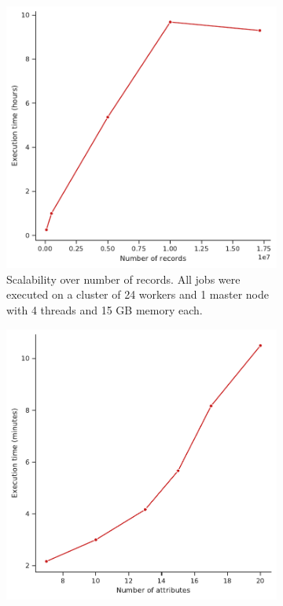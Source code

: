 \documentclass{article}
\begin{document}
    \begin{figure}
        \centering
        \begin{subfigure}[t]{0.45\textwidth}
            \centering
            \includegraphics[width=\textwidth]{figures/plot_num_records.pdf}
            \caption{Scalability over number of records. All jobs were executed on a cluster of 24 workers and 1 master node with 4 threads and 15 GB memory each.}
            \label{fig:plot records}
        \end{subfigure}
        \hfill
        \begin{subfigure}[t]{0.45\textwidth}
            \centering
            \includegraphics[width=\textwidth]{figures/plot_num_attrs.pdf}

\end{subfigure}
\end{figure}
\end{document}

